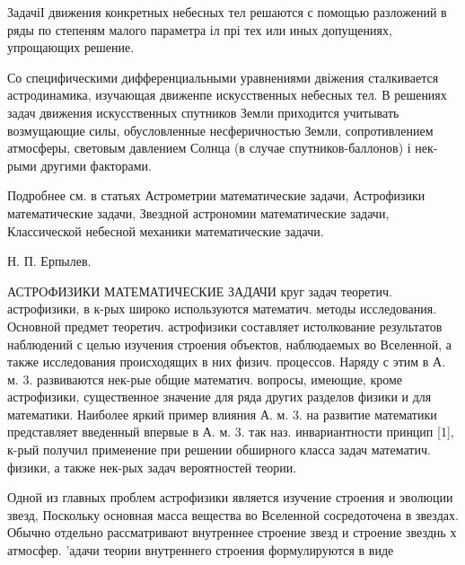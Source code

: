 \documentclass[10pt]{article}
\begin{document}
ЗадачіІ движения конкретных небесных тел решаются с помощью разложений в ряды по степеням малого параметра іл прі тех или иных допущениях, упрощающих решение.



Со специфическими дифференциальными уравнениями двіжения сталкивается астродинамика, изучающая движенпе искусственных небесных тел. В решениях задач движения искусственных спутников Земли приходится учитывать возмущающие силы, обусловленные несферичностью Земли, сопротивлением атмосферы, световым давлением Солнца (в случае спутников-баллонов) і нек-рыми другими факторами.



Подробнее см. в статьях Астрометрии математические задачи, Астрофизики математические задачи, Звездной астрономии математические задачи, Классической небесной механики математические задачи.



Н. П. Ерпылев.



АСТРОФИЗИКИ МАТЕМАТИЧЕСКИЕ ЗАДАЧИ круг задач теоретич. астрофизики, в к-рых широко используются математич. методы исследования. Основной предмет теоретич. астрофизики составляет истолкование результатов наблюдений с целью изучения строения объектов, наблюдаемых во Вселенной, а также исследования происходящих в них физич. процессов. Наряду с этим в А. м. 3. развиваются нек-рые общие математич. вопросы, имеющие, кроме астрофизики, существенное значение для ряда других разделов физики и для математики. Наиболее яркий пример влияния А. м. 3. на развитие математики представляет введенный впервые в А. м. 3. так наз. инвариантности принцип [1], к-рый получил применение при решении обширного класса задач математич. физики, а также нек-рых задач вероятностей теории.



Одной из главных проблем астрофизики является изучение строения и эволюции звезд, Поскольку основная масса вещества во Вселенной сосредоточена в звездах. Обычно отдельно рассматривают внутреннее строение звезд и строение звезднь х атмосфер. 'адачи теории внутреннего строения формулируются в виде
\end{document}

